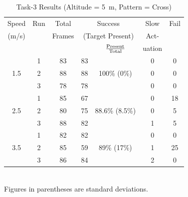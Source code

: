 \begin{table}
\centering\small
\begin{tabular}{|c|c|c|c|c|c|c|}
\hline
Speed & Run & Total & \multicolumn{2}{c|}{Success} & Slow & Fail\\
(m/s) &  & Frames  & \multicolumn{2}{c|}{\footnotesize (Target Present)}& Act-  &  \\
\cline{5-5} 
      &  &         &         & $\rm \frac{Present}{Total}$ & uation  & \\ 
\hline
    & 1 & 83 & 83 &    & 0 & 0 \\
1.5 & 2 & 88 & 88 & 100\% \scriptsize{(0\%)} & 0 & 0 \\
    & 3 & 78 & 78 &    & 0 & 0 \\
\hline
    & 1 & 85 & 67 &        & 0 & 18 \\
2.5 & 2 & 80 & 75 & 88.6\% \scriptsize{(8.5\%)} & 0 &  5 \\
    & 3 & 88 & 82 &        & 1 &  5 \\
\hline
    & 1 & 82 & 82 &        & 0 &  0 \\
3.5 & 2 & 85 & 59 & 89\% \scriptsize{(17\%)} & 1 & 25 \\
    & 3 & 86 & 84 &        & 2 &  0 \\
\hline
\end{tabular}
\begin{captext}
\centering \\[0.1cm] Figures in parentheses are standard deviations. \\
\end{captext}
\caption{Task-3 Results {\footnotesize (Altitude = 5~m, Pattern = Cross)}}
\label{tab:task3-results-5m-cross}
\end{table}

